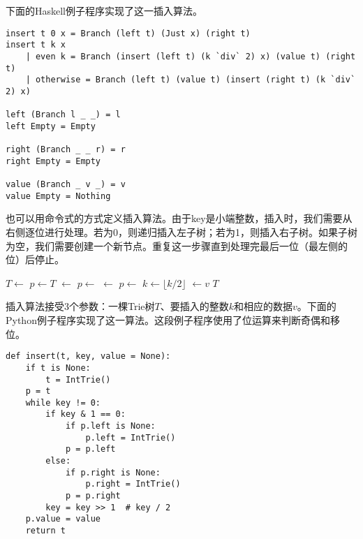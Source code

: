 \documentclass[UTF8]{article}
\begin{document}
下面的Haskell例子程序实现了这一插入算法。

\lstset{language=Haskell}
\begin{lstlisting}[style=Haskell]
insert t 0 x = Branch (left t) (Just x) (right t)
insert t k x
    | even k = Branch (insert (left t) (k `div` 2) x) (value t) (right t)
    | otherwise = Branch (left t) (value t) (insert (right t) (k `div` 2) x)

left (Branch l _ _) = l
left Empty = Empty

right (Branch _ _ r) = r
right Empty = Empty

value (Branch _ v _) = v
value Empty = Nothing
\end{lstlisting}

也可以用命令式的方式定义插入算法。由于key是小端整数，插入时，我们需要从右侧逐位进行处理。若为0，则递归插入左子树；若为1，则插入右子树。如果子树为空，我们需要创建一个新节点。重复这一步骤直到处理完最后一位（最左侧的位）后停止。

\begin{algorithmic}[1]
    \State $T \gets$ 
  \EndIf
  \State $p \gets T$
        \State {} $\gets$ 
      \EndIf
      \State $p \gets$ 
    \Else
        \State {} $\gets$ 
      \EndIf
      \State $p \gets$ 
    \EndIf
    \State $k \gets \lfloor k/2 \rfloor$
  \EndWhile
  \State {} $\gets v$
  \State \Return $T$
\EndFunction
\end{algorithmic}

插入算法接受3个参数：一棵Trie树$T$、要插入的整数$k$和相应的数据$v$。下面的Python例子程序实现了这一算法。这段例子程序使用了位运算来判断奇偶和移位。

\lstset{language=Python}
\begin{lstlisting}
def insert(t, key, value = None):
    if t is None:
        t = IntTrie()
    p = t
    while key != 0:
        if key & 1 == 0:
            if p.left is None:
                p.left = IntTrie()
            p = p.left
        else:
            if p.right is None:
                p.right = IntTrie()
            p = p.right
        key = key >> 1  # key / 2
    p.value = value
    return t
\end{lstlisting}
\end{document}

